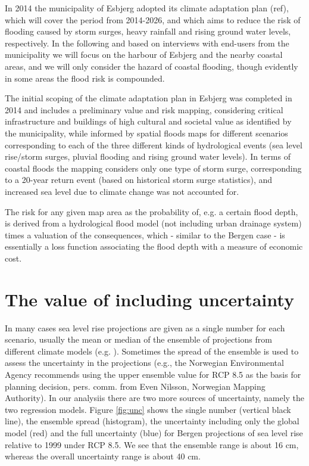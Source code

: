 \documentclass[draft,linenumbers]{agujournal}
\begin{document}
In 2014 the municipality of Esbjerg adopted its climate adaptation plan {\color{blue}(ref)}, which will cover the period from 2014-2026, and which aims to reduce the risk of flooding caused by storm surges, heavy rainfall and rising ground water levels, respectively. In the following and based on interviews with end-users from the municipality we will focus on the harbour of Esbjerg and the nearby coastal areas, and we will only consider the hazard of coastal flooding, though evidently in some areas the flood risk is compounded. 

The initial scoping of the climate adaptation plan in Esbjerg was completed in 2014 and includes a preliminary value and risk mapping, considering critical infrastructure and buildings of high cultural and societal value as identified by the municipality, while informed by spatial floods maps for different scenarios corresponding to each of the three different kinds of hydrological events (sea level rise/storm surges, pluvial flooding and rising ground water levels). In terms of coastal floods the mapping considers only one type of storm surge, corresponding to a 20-year return event (based on historical storm surge statistics), and increased sea level due to climate change was not accounted for. 

The risk for any given map area as the probability of, e.g. a certain flood depth, is derived from a hydrological flood model (not including urban drainage system) times a valuation of the consequences, which - similar to the Bergen case - is essentially a loss function associating the flood depth with a measure of economic cost. 

\section{The value of including uncertainty}
\label{unc}

In many cases sea level rise projections are given as a single number for each scenario, usually the mean or median of the ensemble of projections from different climate models (e.g. \citet{climateimpactgroup}). Sometimes the spread of the ensemble is used to assess the uncertainty in the projections (e.g., the Norwegian Environmental Agency recommends using the upper ensemble value for RCP 8.5 as the basis for planning decision, pers. comm. from Even Nilsson, Norwegian Mapping Authority). In our analysiis there are two more sources of uncertainty, namely the two regression models. Figure \ref{fig:unc} shows the single number (vertical black line), the ensemble spread (histogram), the uncertainty including only the global model (red) and the full uncertainty (blue) for Bergen projections of sea level rise relative to 1999 under RCP 8.5. We see that the ensemble range is about 16 cm, whereas the overall uncertainty range is about 40 cm.
\end{document}
